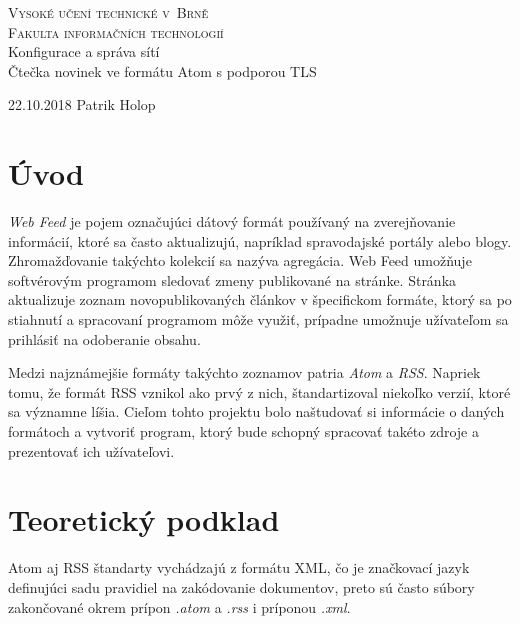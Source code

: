\documentclass[11pt,a4paper]{article}
\begin{document}
\begin{titlepage}
 \begin{center}
 {
  \Huge
  \textsc{Vysoké učení technické v~Brně\\
  \vspace{-2mm}
  \huge
  Fakulta informačních technologií}\\
 }
 {
  \LARGE
  Konfigurace a správa sítí\\
 }
  \vspace{-0.5mm}
 {
  \Huge
  Čtečka novinek ve formátu Atom s podporou TLS\\
 }
 \end{center}
{\Large 22.10.2018 \hfill Patrik Holop}
\end{titlepage}

\tableofcontents
\newpage

\section{Úvod}

\textit{Web Feed} je pojem označujúci dátový formát používaný na zverejňovanie informácií, ktoré sa často aktualizujú, napríklad spravodajské portály alebo blogy. Zhromažďovanie takýchto kolekcií sa nazýva agregácia. Web Feed umožňuje softvérovým programom sledovať zmeny publikované na stránke. Stránka aktualizuje zoznam novopublikovaných článkov v špecifickom formáte, ktorý sa po stiahnutí a spracovaní programom môže využiť, prípadne umožnuje užívateľom sa prihlásiť na odoberanie obsahu.

Medzi najznámejšie formáty takýchto zoznamov patria \textit{Atom} a \textit{RSS}. Napriek tomu, že formát RSS vznikol ako prvý z nich, štandartizoval niekoľko verzií, ktoré sa významne líšia. Cieľom tohto projektu bolo naštudovať si informácie o daných formátoch a vytvoriť program, ktorý bude schopný spracovať takéto zdroje a prezentovať ich užívateľovi.

\section{Teoretický podklad}

Atom aj RSS štandarty vychádzajú z formátu XML, čo je značkovací jazyk definujúci sadu pravidiel na zakódovanie dokumentov, preto sú často súbory zakončované okrem prípon \textit{.atom} a \textit{.rss} i príponou \textit{.xml}. 
\end{document}
